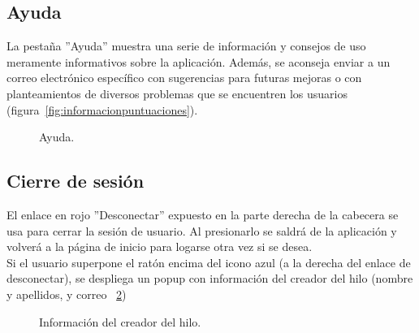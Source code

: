 \documentclass[a4paper, 12pt]{book}
\begin{document}
\subsection{Ayuda}
La pesta\~na ''Ayuda'' muestra una serie de informaci\'on y consejos de uso meramente informativos sobre la aplicaci\'on. Adem\'as, se aconseja enviar a un 
correo electr\'onico espec\'ifico con sugerencias para futuras mejoras o con planteamientos de diversos problemas que se encuentren los usuarios 
(figura~\ref{fig:informacionpuntuaciones}).
\begin{figure}[htbp] 
  \centering
  \caption{Ayuda.}
  \label{figura:ayuda}
\end{figure}


\subsection{Cierre de sesi\'on}
El enlace en rojo ''Desconectar'' expuesto en la parte derecha de la cabecera se usa para cerrar la sesi\'on de usuario. Al presionarlo se saldr\'a de la 
aplicaci\'on y volver\'a a la p\'agina de inicio para logarse otra vez si se desea.\\
Si el usuario superpone el rat\'on encima del icono azul (a la derecha del enlace de desconectar), se despliega un popup con informaci\'on del creador del 
hilo (nombre y apellidos, y correo ~\ref{figura:infocreador})
\begin{figure}[htbp] 
  \centering
  \caption{Informaci\'on del creador del hilo.}
  \label{figura:infocreador}
\end{figure}
\end{document}
